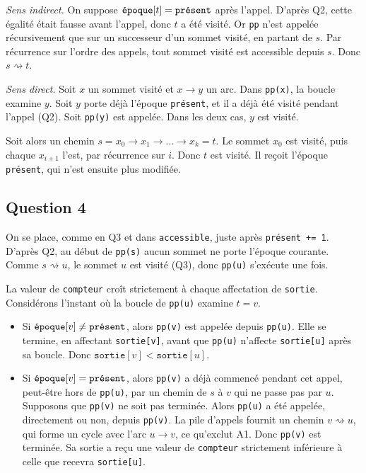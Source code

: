 \documentclass[11pt,a4paper]{article}
\providecommand{\tightlist}{\setlength{\itemsep}{0pt}\setlength{\parskip}{0pt}}
\newcommand{\equationajustee}[1]{%
  \sbox{\boiteequation}{$\displaystyle #1$}%
  \ifdim\wd\boiteequation>\linewidth
    \[\resizebox{\linewidth}{!}{\usebox{\boiteequation}}\]%
  \else
    \[#1\]%
  \fi}
\begin{document}
\emph{Sens indirect.} On suppose \(\texttt{\text{époque}}[t]=\texttt{\text{présent}}\) après l'appel. D'après Q2, cette égalité était fausse avant l'appel, donc \(t\) a été visité. Or \texttt{pp} n'est appelée récursivement que sur un successeur d'un sommet visité, en partant de \(s\). Par récurrence sur l'ordre des appels, tout sommet visité est accessible depuis \(s\). Donc \(s\rightsquigarrow t\).

\emph{Sens direct.} Soit \(x\) un sommet visité et \(x\to y\) un arc. Dans \texttt{pp(x)}, la boucle examine \(y\). Soit \(y\) porte déjà l'époque \texttt{présent}, et il a déjà été visité pendant l'appel (Q2). Soit \texttt{pp(y)} est appelée. Dans les deux cas, \(y\) est visité.

Soit alors un chemin \(s=x_0\to x_1\to\dots\to x_k=t\). Le sommet \(x_0\) est visité, puis chaque \(x_{i+1}\) l'est, par récurrence sur \(i\). Donc \(t\) est visité. Il reçoit l'époque \texttt{présent}, qui n'est ensuite plus modifiée.

\equationajustee{\boxed{\ s\rightsquigarrow t\iff \texttt{\text{époque}}[t]=\texttt{\text{présent}}\ \text{\text{après} l'\text{exécution}}\ }}

\hypertarget{question-4}{%
\subsection{Question 4}\label{question-4}}

On se place, comme en Q3 et dans \texttt{accessible}, juste après \texttt{présent\ +=\ 1}. D'après Q2, au début de \texttt{pp(s)} aucun sommet ne porte l'époque courante. Comme \(s\rightsquigarrow u\), le sommet \(u\) est visité (Q3), donc \texttt{pp(u)} s'exécute une fois.

La valeur de \texttt{compteur} croît strictement à chaque affectation de \texttt{sortie}. Considérons l'instant où la boucle de \texttt{pp(u)} examine \(t=v\).

\begin{itemize}
\tightlist
\item
  Si \(\texttt{\text{époque}}[v]\neq\texttt{\text{présent}}\), alors \texttt{pp(v)} est appelée depuis \texttt{pp(u)}. Elle se termine, en affectant \texttt{sortie{[}v{]}}, avant que \texttt{pp(u)} n'affecte \texttt{sortie{[}u{]}} après sa boucle. Donc \(\texttt{sortie}[v]<\texttt{sortie}[u]\).
\item
  Si \(\texttt{\text{époque}}[v]=\texttt{\text{présent}}\), alors \texttt{pp(v)} a déjà commencé pendant cet appel, peut-être hors de \texttt{pp(u)}, par un chemin de \(s\) à \(v\) qui ne passe pas par \(u\). Supposons que \texttt{pp(v)} ne soit pas terminée. Alors \texttt{pp(u)} a été appelée, directement ou non, depuis \texttt{pp(v)}. La pile d'appels fournit un chemin \(v\rightsquigarrow u\), qui forme un cycle avec l'arc \(u\to v\), ce qu'exclut A1. Donc \texttt{pp(v)} est terminée. Sa sortie a reçu une valeur de \texttt{compteur} strictement inférieure à celle que recevra \texttt{sortie{[}u{]}}.
\end{itemize}
\end{document}
